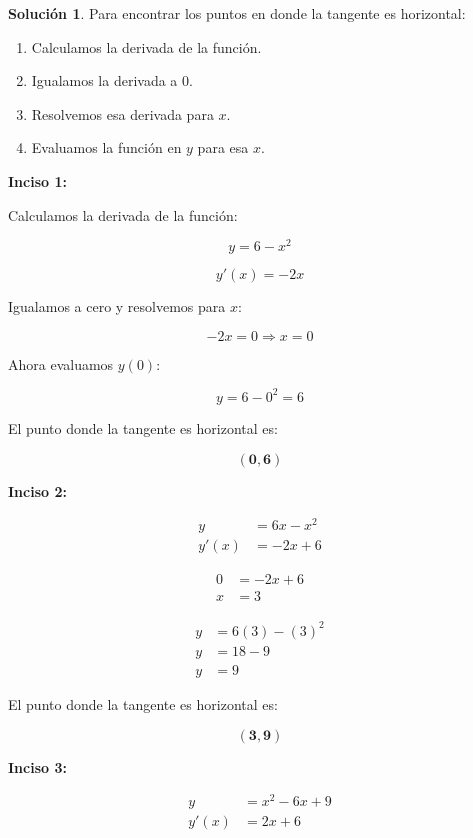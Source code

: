 \documentclass{article}
\theoremstyle{definition}
\newtheorem*{solution}{Solución}
\begin{document}
\begin{solution}

Para encontrar los puntos en donde la tangente es horizontal:
\begin{enumerate}
    \item Calculamos la derivada de la función.
    \item Igualamos la derivada a \( 0 \).
    \item Resolvemos esa derivada para \( x \).
    \item Evaluamos la función en \( y \) para esa \( x \).
\end{enumerate}

\textbf{Inciso 1:} 

Calculamos la derivada de la función:

    \[
        y = 6 - x^2
    \]
    
    \[
        y'(x) = -2x
    \]

Igualamos a cero y resolvemos para \( x \):

    \[
        -2x = 0 \Rightarrow x = 0
    \]

Ahora evaluamos \( y(0) \):

    \[
        y = 6 - 0^2 = 6
    \]
    
El punto donde la tangente es horizontal es:

    \[
        \mathbf{(0,6)}
    \]

\textbf{Inciso 2:}

    \begin{align*}
        y &= 6x - x^2 \\
        y'(x) &= -2x + 6 
    \end{align*}

    \begin{align*}
        0 &= -2x + 6  \\  
        x &= 3
    \end{align*}

    \begin{align*}
        y &= 6(3)-(3)^2 \\
        y &= 18 - 9 \\
        y &= 9
    \end{align*}

El punto donde la tangente es horizontal es:

    \[
        \mathbf{(3,9)}
    \]

\textbf{Inciso 3:}

    \begin{align*}
        y &= x^2 - 6x + 9 \\
        y'(x) &= 2x+6
    \end{align*}


\end{solution}
\end{document}
